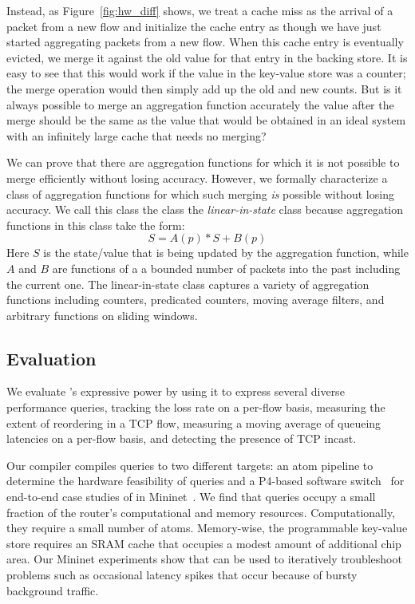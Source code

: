Instead, as Figure~\ref{fig:hw_diff} shows, we treat a cache miss as the
arrival of a packet from a new flow and initialize the cache entry as though we
have just started aggregating packets from a new flow. When this cache entry is
eventually evicted, we merge it against the old value for that entry in the
backing store. It is easy to see that this would work if the value in the
key-value store was a counter; the merge operation would then simply add up the
old and new counts.  But is it always possible to merge an aggregation function
accurately \ie the value after the merge should be the same as the value that
would be obtained in an ideal system with an infinitely large cache that needs
no merging?

We can prove that there are aggregation functions for which it is not possible
to merge efficiently without losing accuracy. However, we formally characterize
a class of aggregation functions for which such merging {\em is} possible
without losing accuracy. We call this class the class the {\em linear-in-state}
class because aggregation functions in this class take the form:
\begin{equation}
S = A(p) * S + B(p)
\end{equation}
Here $S$ is the state/value that is being updated by the aggregation function,
while $A$ and $B$ are functions of a a bounded number of packets into the past
including the current one. The linear-in-state class captures a variety of
aggregation functions including counters, predicated counters, moving average
filters, and arbitrary functions on sliding windows.

\subsection{Evaluation} We evaluate \TheSystem's expressive power by using it
to express several diverse performance queries, \eg tracking the loss rate on a
per-flow basis, measuring the extent of reordering in a TCP flow, measuring a
moving average of queueing latencies on a per-flow basis, and detecting the
presence of TCP incast.

Our \TheSystem compiler compiles queries to two different targets: an atom
pipeline to determine the hardware feasibility of \TheSystem queries and a
P4-based software switch~\cite{p4-bmv2} for end-to-end case studies of
\TheSystem in Mininet~\cite{mininet}. We find that \TheSystem queries occupy a
small fraction of the router's computational and memory resources.
Computationally, they require a small number of atoms. Memory-wise, the
programmable key-value store requires an SRAM cache that occupies a modest
amount of additional chip area. Our Mininet experiments show that \TheSystem
can be used to iteratively troubleshoot problems such as occasional latency
spikes that occur because of bursty background traffic.

